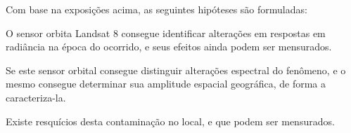 %
\hspace*{1.25 cm} Com base na exposições acima, as seguintes hipóteses são formuladas:
\begin{description} [itemsep=1pt,parsep=1pt]\vspace{0.00mm} 
	\item[$H_{1}$:] O sensor orbita Landsat 8 consegue identificar alterações em respostas em radiância na época  do ocorrido, e seus efeitos ainda podem ser mensurados.
	\item[$H_{2}$:] Se este sensor orbital consegue distinguir alterações espectral  do fenômeno, e o mesmo consegue determinar sua amplitude espacial geográfica, de forma a caracteriza-la.
	\item[$H_{3}$:] Existe resquícios desta contaminação no local, e que podem ser mensurados.
\end{description}
\label{h1}\label{h2}\label{h3}